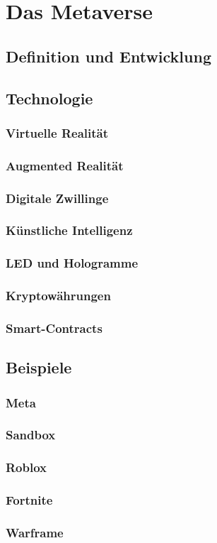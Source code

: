 \chapter{Das Metaverse}\label{ch:Metaverse}

\section{Definition und Entwicklung} %
\section{Technologie}

\subsection{Virtuelle Realität}
\subsection{Augmented Realität}
\subsection{Digitale Zwillinge}
\subsection{Künstliche Intelligenz}
\subsection{LED und Hologramme}
\subsection{Kryptowährungen}
\subsection{Smart-Contracts}

\section{Beispiele}

\subsection{Meta}
\subsection{Sandbox}
\subsection{Roblox}
\subsection{Fortnite}
\subsection{Warframe}